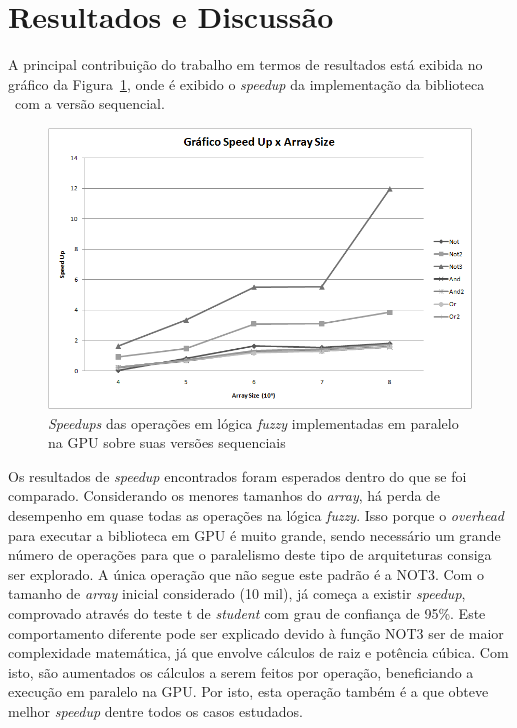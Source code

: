 \documentclass[12pt]{article}
\begin{document}
\section{Resultados e Discussão}	
\label{sec:resultados}

A principal contribuição do trabalho em termos de resultados está exibida no gráfico da Figura~\ref{fig:speedup}, onde é exibido o \textit{speedup} da implementação da biblioteca \libname~com a versão sequencial.

\begin{figure}[!h]
\centering
\includegraphics[scale=0.8]{graphics/g.png}
\caption{\textit{Speedups} das operações em lógica \textit{fuzzy} implementadas em paralelo na GPU sobre suas versões sequenciais}
\label{fig:speedup}
\end{figure}

Os resultados de \textit{speedup} encontrados foram esperados dentro do que se foi comparado. Considerando os menores tamanhos do \textit{array}, há perda de desempenho em quase todas as operações na lógica \textit{fuzzy}. Isso porque o \textit{overhead} para executar a biblioteca em GPU é muito grande, sendo necessário um grande número de operações para que o paralelismo deste tipo de arquiteturas consiga ser explorado. A única operação que não segue este padrão é a NOT3. Com o tamanho de \textit{array} inicial considerado (10 mil), já começa a existir \textit{speedup}, comprovado através do teste t de \textit{student} com grau de confiança de 95\%. Este comportamento diferente pode ser explicado devido à função NOT3 ser de maior complexidade matemática, já que envolve cálculos de raiz e potência cúbica. Com isto, são aumentados os cálculos a serem feitos por operação, beneficiando a execução em paralelo na GPU. Por isto, esta operação também é a que obteve melhor \textit{speedup} dentre todos os casos estudados.
\end{document}
